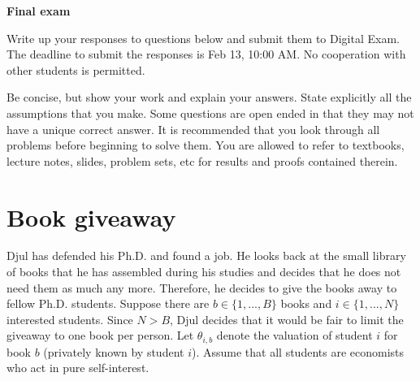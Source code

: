 \documentclass[a4paper]{article}
\newif\ifsolutions
\begin{document}
	
	{\ifsolutions \else	
		
		\fi}
	
	\begin{center}
		\LARGE\textbf{Final exam {\ifsolutions solutions \fi}}
	\end{center}
	
	{\ifsolutions \else	
	Write up your responses to questions below and submit them to Digital Exam. The deadline to submit the responses is Feb 13, 10:00 AM. No cooperation with other students is permitted.
	
	Be concise, but show your work and explain your answers. State explicitly all the assumptions that you make. Some questions are open ended in that they may not have a unique correct answer. It is recommended that you look through all problems before beginning to solve them. You are allowed to refer to textbooks, lecture notes, slides, problem sets, etc for results and proofs contained therein.
	\fi}
	
	
	\section{Book giveaway}
	Djul has defended his Ph.D. and found a job. He looks back at the small library of books that he has assembled during his studies and decides that he does not need them as much any more. Therefore, he decides to give the books away to fellow Ph.D. students. Suppose there are $b \in \{1,...,B\}$ books and $i \in \{1,...,N\}$ interested students. Since $N > B$, Djul decides that it would be fair to limit the giveaway to one book per person. Let $\theta_{i,b}$ denote the valuation of student $i$ for book $b$ (privately known by student $i$). Assume that all students are economists who act in pure self-interest.
	
\end{document}
